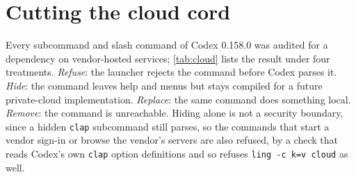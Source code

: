 \documentclass[11pt]{article}
\newcommand{\code}[1]{\texttt{#1}}
\begin{document}
\section{Cutting the cloud cord}
\label{sec:cloud}

Every subcommand and slash command of Codex 0.158.0 was audited for a dependency on vendor-hosted
services; \cref{tab:cloud} lists the result under four treatments. \emph{Refuse}: the launcher
rejects the command before Codex parses it. \emph{Hide}: the command leaves help and menus but stays
compiled for a future private-cloud implementation. \emph{Replace}: the same command does something
local. \emph{Remove}: the command is unreachable. Hiding alone is not a security boundary, since a
hidden \code{clap} subcommand still parses, so the commands that start a vendor sign-in or browse
the vendor's servers are also refused, by a check that reads Codex's own \code{clap} option
definitions and so refuses \code{ling -c k=v cloud} as well.
\end{document}
